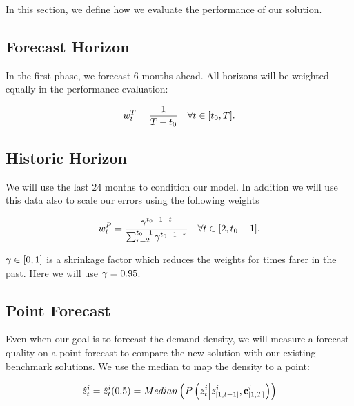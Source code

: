 \documentclass[11pt,headings=small]{scrartcl}
\begin{document}
In this section, we define how we evaluate the performance of our solution.

\subsection{Forecast Horizon}
\label{subsection:ForecastHorizon}

In the first phase, we forecast 6 months ahead. All horizons will be weighted equally in the performance evaluation:

\begin{equation}\label{horizonweigths}
w^T_t = \frac{1}{T - t_{0}}\quad \forall t\in[t_{0},T].
\end{equation}

\subsection{Historic Horizon}
\label{subsection:HistoricHorizon}

We will use the last 24 months to condition our model. In addition we will use this data also to scale our errors using the following weights

\begin{equation}\label{pastweigths}
w^P_t = \frac{\gamma ^{t_{0} - 1 - t}}{\sum_{r=2}^{t_{0} - 1}\gamma ^{t_{0} - 1 - r}}  \quad \forall t\in[2,t_{0}-1].
\end{equation}

$\gamma\in[0,1]$ is a shrinkage factor which reduces the weights for times farer in the past. Here we will use  $\gamma=0.95$.

\subsection{Point Forecast}
\label{subsection:PointForecast}

Even when our goal is to forecast the demand density, we will measure a forecast quality on a point forecast to compare the new solution with our existing benchmark solutions. We use the median to map the density to a point:

\begin{equation}\label{pointforecast}
\hat{z}^{i}_{t} = \hat{z}^{i}_{t} (0.5)  =  Median\left(P \left( z^{i}_{t} \Big| z^{i}_{[1,t-1]} , \textbf{c}^{i}_{[1,T]} \right)\right)
\end{equation}
\end{document}
